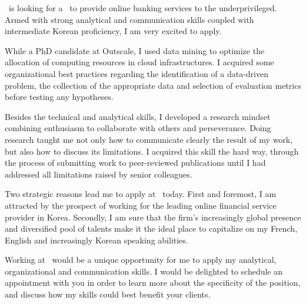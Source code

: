 \company~is looking for a \job~to provide online banking services to the underprivileged.  
Armed with strong analytical and communication skills coupled with intermediate Korean proficiency, I am very excited to apply. 

While a PhD candidate at Outscale, I used data mining to optimize the allocation of computing resources in cloud infrastructures. 
I acquired some organizational best practices regarding the identification of a data-driven problem, the collection of the appropriate data and selection of evaluation metrics before testing any hypotheses. 

Besides the technical and analytical skills, I developed a research mindset combining enthusiasm to collaborate with others and perseverance.  
Doing research taught me not only how to communicate clearly the result of my work, but also how to discuss its limitations. 
I acquired this skill the hard way, through the process of submitting work to peer-reviewed publications until I had addressed all limitations raised by senior colleagues.  

Two strategic reasons lead me to apply at \company~today.   
First and foremost, I am attracted by the prospect of working for the leading online financial service provider in Korea.  
Secondly, I am sure that the firm's increasingly global presence and diversified pool of talents make it the ideal place to capitalize on my French, English and increasingly Korean speaking abilities. 

Working at \company~would be a unique opportunity for me to apply my analytical, organizational and communication skills. 
I would be delighted to schedule an appointment with you in order to learn more about the specificity of the position, and discuss how my skills could best benefit your clients.

